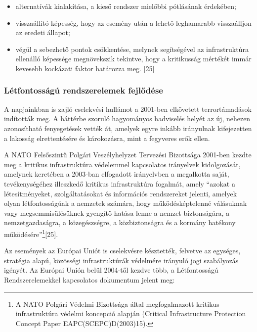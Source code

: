 \documentclass[12pt,magyar,a4paper,oneside]{scrreprt}
\providecommand{\tightlist}{%
  \setlength{\itemsep}{0pt}\setlength{\parskip}{0pt}}
\begin{document}
\begin{itemize}
\tightlist
\item
  alternatívák kialakítása, a kieső rendszer mielőbbi pótlásának
  érdekében;
\item
  visszaállító képesség, hogy az esemény után a lehető leghamarabb
  visszaálljon az eredeti állapot;
\item
  végül a sebezhető pontok csökkentése, melynek segítségével az
  infrastruktúra ellenálló képessége megnövekszik tekintve, hogy a
  kritikusság mértékét immár kevesebb kockázati faktor határozza meg.
  {[}25{]}
\end{itemize}

\hypertarget{luxe9tfontossuxe1guxfa-rendszerelemek-fejlux151duxe9se}{%
\subsubsection{Létfontosságú rendszerelemek
fejlődése}\label{luxe9tfontossuxe1guxfa-rendszerelemek-fejlux151duxe9se}}

A napjainkban is zajló cselekvési hullámot a 2001-ben elkövetett
terrortámadások indították meg. A háttérbe szoruló hagyományos
hadviselés helyét az új, nehezen azonosítható fenyegetések vették át,
amelyek egyre inkább irányulnak kifejezetten a lakosság elrettentésére
és károkozásra, mint a fegyveres erők ellen.

A NATO Felsőszintű Polgári Veszélyhelyzet Tervezési Bizottsága 2001-ben
kezdte meg a kritikus infrastruktúra védelemmel kapcsolatos irányelvek
kidolgozását, amelynek keretében a 2003-ban elfogadott irányelvben a
megalkotta saját, tevékenységéhez illeszkedő kritikus infrastruktúra
fogalmát, amely ``azokat a létesítményeket, szolgáltatásokat és
információs rendszereket jelenti, amelyek olyan létfontosságúak a
nemzetek számára, hogy működésképtelenné válásuknak vagy
megsemmisülésüknek gyengítő hatása lenne a nemzet biztonságára, a
nemzetgazdaságra, a közegészségre, a közbiztonságra és a kormány
hatékony működésére''\footnote{A NATO Polgári Védelmi Bizottsága által
  megfogalmazott kritikus infrastruktúra védelmi koncepció alapján
  (Critical Infrastructure Protection Concept Paper
  EAPC(SCEPC)D(2003)15).}{[}25{]}.

Az események az Európai Uniót is cselekvésre késztették, felvetve az
egységes, stratégia alapú, közösségi infrastruktúrák védelmére irányuló
jogi szabályozás igényét. Az Európai Unión belül 2004-től kezdve több, a
Létfontosságú Rendszerelemekkel kapcsolatos dokumentum jelent meg:
\end{document}
